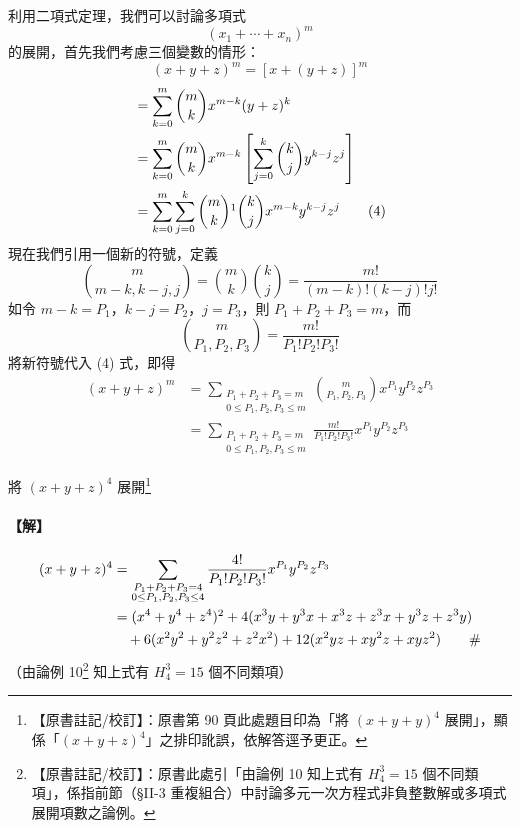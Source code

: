利用二項式定理，我們可以討論多項式
\[ (x_1 + \dotsb + x_n)^m \]
的展開，首先我們考慮三個變數的情形：
\[ (x + y + z)^m = [x + (y + z)]^m \]
\begin{align}
&= \sum_{k=0}^m \binom{m}{k} x^{m-k} (y + z)^k \notag \\
&= \sum_{k=0}^m \binom{m}{k} x^{m-k} \left[ \sum_{j=0}^k \binom{k}{j} y^{k-j} z^j \right] \notag \\
&= \sum_{k=0}^m \sum_{j=0}^k \binom{m}{k}\footnotemark \binom{k}{j} x^{m-k} y^{k-j} z^j \label{eq:b5-2-4-4}\tag{4}
\end{align}
\label{note:b5-ch2-p90-binom}
現在我們引用一個新的符號，定義
\[ \binom{m}{m-k, k-j, j} = \binom{m}{k} \binom{k}{j} = \frac{m!}{(m-k)!(k-j)!j!} \]
如令 $m - k = P_1$，$k - j = P_2$，$j = P_3$，則 $P_1 + P_2 + P_3 = m$，而
\[ \binom{m}{P_1, P_2, P_3} = \frac{m!}{P_1! P_2! P_3!} \]
將新符號代入 (4) 式，即得
\begin{align*}
(x + y + z)^m &= \sum_{\substack{P_1 + P_2 + P_3 = m \\ 0 \le P_1, P_2, P_3 \le m}} \binom{m}{P_1, P_2, P_3} x^{P_1} y^{P_2} z^{P_3} \\
&= \sum_{\substack{P_1 + P_2 + P_3 = m \\ 0 \le P_1, P_2, P_3 \le m}} \frac{m!}{P_1! P_2! P_3!} x^{P_1} y^{P_2} z^{P_3}
\end{align*}

\medskip
\begin{discussion}\label{ex:b5-2-disc11}
將 $(x + y + z)^4$ 展開\label{note:b5-ch2-p90-ex11-typo}\footnote{【原書註記/校訂】：原書第 90 頁此處題目印為「將 $(x+y+y)^4$ 展開」，顯係「$(x+y+z)^4$」之排印訛誤，依解答逕予更正。}
\end{discussion}
\paragraph{【解】}
\begin{align*}
(x + y + z)^4 &= \sum_{\substack{P_1 + P_2 + P_3 = 4 \\ 0 \le P_1, P_2, P_3 \le 4}} \frac{4!}{P_1! P_2! P_3!} x^{P_1} y^{P_2} z^{P_3} \\
&= (x^4 + y^4 + z^4)\footnotemark + 4(x^3 y + y^3 x + x^3 z + z^3 x + y^3 z + z^3 y) \\
&\quad + 6(x^2 y^2 + y^2 z^2 + z^2 x^2) + 12(x^2 yz + xy^2 z + xyz^2) \qquad \#
\end{align*}
\label{note:b5-ch2-p90-ex11-y4}%
（由論例 10\label{note:b5-ch2-p90-disc10}\footnote{【原書註記/校訂】：原書此處引「由論例 10 知上式有 $H_4^3 = 15$ 個不同類項」，係指前節（\S II-3 重複組合）中討論多元一次方程式非負整數解或多項式展開項數之論例。} 知上式有 $H_4^3 = 15$ 個不同類項）

